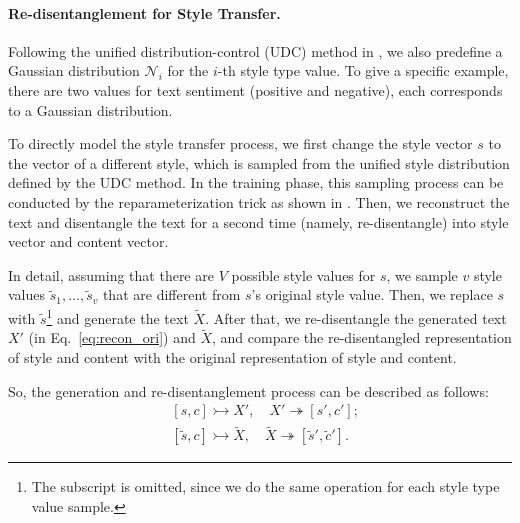 \documentclass[11pt,a4paper]{article}
\renewcommand{\cite}{\citep}
\begin{document}
\paragraph{Re-disentanglement for Style Transfer.}
Following the unified distribution-control (UDC) method  in \cite{sha2021multi}, we also predefine a Gaussian distribution $\mathcal N_i$ for the $i$-th style type value. To give a specific example,  there are two values for text sentiment (positive and negative), each corresponds to a Gaussian distribution. 

To directly model the style transfer process,  we first change the style vector $s$ to the vector of a different style, which is sampled from the  unified style distribution defined by the UDC method. In the training phase, this sampling process can be conducted by the reparameterization trick as shown in \cite{kingma2014auto}.
Then, we   reconstruct the text 
and disentangle the text for a second time (namely, re-disentangle) into style vector and content vector. 


In detail, assuming that there are $V$ possible style values for  $s$, we sample $v$  style values  $\tilde{s}_1,\ldots,\tilde{s}_v$ that are different from $s$'s original style value. Then, we  replace $s$ with $\tilde{s}$\footnote{The subscript is omitted, since we do the same operation for each style type value sample.} and generate the text $\tilde{X}$.
After that, we re-disentangle the  generated text $X'$ (in Eq.~\eqref{eq:recon_ori}) and $\tilde{X}$, and compare the re-disentangled representation of style  and content   with the  original representation of style  and content.


So, the generation and re-disentanglement process can be described as follows:
\begin{align}
    &[s, c] \rightarrowtail X', \quad  X' \twoheadrightarrow [s', c'];\\
    &[\tilde s,c]\rightarrowtail\tilde X,  \quad\tilde X \twoheadrightarrow [\tilde s', \tilde c']. \label{eq:transfer_dis}
\end{align}
\end{document}
